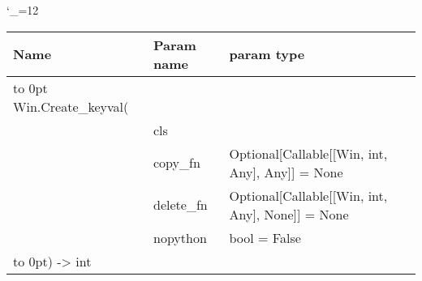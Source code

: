 \begingroup \catcode`\_=12 \tt
\begin{tabular}{lll}
\toprule
\textrm{Name}&\textrm{Param name}&\textrm{param type}\\
\midrule
\hbox to 0pt {Win.Create_keyval(\hss}\\
& cls\\
& copy_fn & Optional[Callable[[Win, int, Any], Any]] = None\\
& delete_fn & Optional[Callable[[Win, int, Any], None]] = None\\
& nopython & bool = False\\
\hbox to 0pt{) -> int\hss}\\
\bottomrule
\end{tabular}
\endgroup
